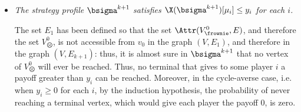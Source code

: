 \begin{itemize}
\begin{itemize}
        
            \item \emph{The strategy profile $\bsigma^{k+1}$ satisfies $\X({\bsigma^{k+1}})[\mu_i] \leq y_i$ for each $i$.}
        
        The set $E_1$ has been defined so that the set $\Attr(V_{\frownie}^0, E)$, and therefore the set $V_{\frownie}^0$, is not accessible from $v_0$ in the graph $(V, E_1)$, and therefore in the graph $(V, E_{k+1})$: thus, it is almost sure in $\bsigma^{k+1}$ that no vertex of $V_{\frownie}^0$ will ever be reached.
        Thus, no terminal that gives to some player $i$ a payoff greater than $y_i$ can be reached.
        Moreover, in the cycle-averse case, i.e. when $y_i \geq 0$ for each $i$, by the induction hypothesis, the probability of never reaching a terminal vertex, which would give each player the payoff $0$, is zero.
        



\end{itemize}
\end{itemize}
